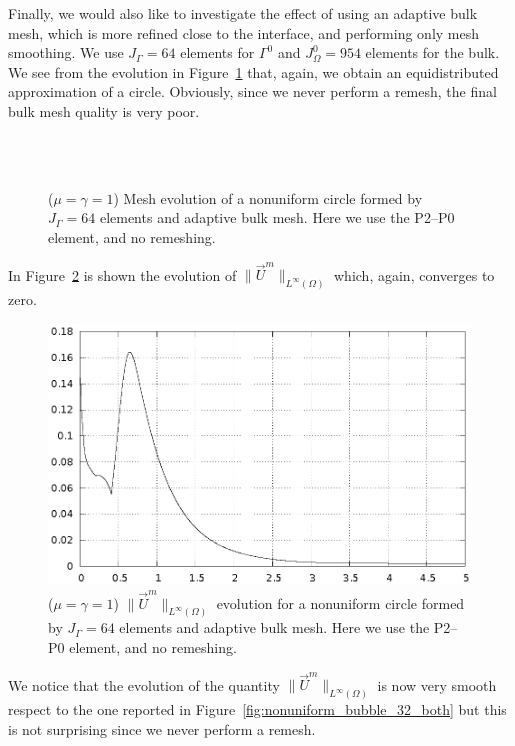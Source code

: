 Finally, we would also like to investigate the effect of using an adaptive bulk
mesh, which is more refined close to the interface, and performing only mesh
smoothing. We use $J_\Gamma = 64$ elements for $\Gamma^0$ and $J_\Omega^0 =
954$ elements for the bulk. We see from the evolution in
Figure~\ref{fig:nonuniform_bubble_64_adaptive} that, again, we obtain an
equidistributed approximation of a circle. Obviously, since we never perform a
remesh, the final bulk mesh quality is very poor.
\begin{figure}[htbp]
\centering
{}\\
\\
\caption[Stokes equidistribution property adaptive mesh]
{($\mu=\gamma=1$) Mesh evolution of a nonuniform circle formed by
$J_\Gamma = 64$ elements and adaptive bulk mesh. Here we use the P2--P0
element, and no remeshing.}
\label{fig:nonuniform_bubble_64_adaptive}
\end{figure}
In Figure~\ref{fig:nonuniform_bubble_velocity_64_coarse_smooth} is shown the
evolution of $\|\vec U^m\|_{L^\infty(\Omega)}$ which, again, converges to zero.
\begin{figure}[htbp]
\centering
\includegraphics[width=.45\textwidth]
{figures/stokes/nonuniform_bubble_velocity_64_coarse_smooth.ps}
\caption[Stokes equidistribution velocity adaptive mesh]
{($\mu=\gamma=1$) $\|\vec U^m\|_{L^\infty(\Omega)}$ evolution for a nonuniform
circle formed by $J_\Gamma = 64$ elements and adaptive bulk mesh. Here we use
the P2--P0 element, and no remeshing.}
\label{fig:nonuniform_bubble_velocity_64_coarse_smooth}
\end{figure}
We notice that the evolution of the quantity $\|\vec U^m\|_{L^\infty(\Omega)}$
is now very smooth respect to the one reported in
Figure~\ref{fig:nonuniform_bubble_32_both} but this is not surprising since we
never perform a remesh.

